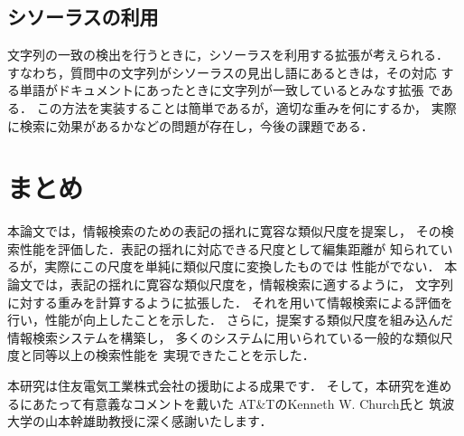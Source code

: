 \subsection{シソーラスの利用}

文字列の一致の検出を行うときに，シソーラスを利用する拡張が考えられる．
すなわち，質問中の文字列がシソーラスの見出し語にあるときは，その対応
する単語がドキュメントにあったときに文字列が一致しているとみなす拡張
である．
この方法を実装することは簡単であるが，適切な重みを何にするか，
実際に検索に効果があるかなどの問題が存在し，今後の課題である．

\section{まとめ}

本論文では，情報検索のための表記の揺れに寛容な類似尺度を提案し，
その検索性能を評価した．表記の揺れに対応できる尺度として編集距離が
知られているが，実際にこの尺度を単純に類似尺度に変換したものでは
性能がでない．
本論文では，表記の揺れに寛容な類似尺度を，情報検索に適するように，
文字列に対する重みを計算するように拡張した．
それを用いて情報検索による評価を行い，性能が向上したことを示した．
さらに，提案する類似尺度を組み込んだ情報検索システムを構築し，
多くのシステムに用いられている一般的な類似尺度と同等以上の検索性能を
実現できたことを示した．

\acknowledgment

本研究は住友電気工業株式会社の援助による成果です．
そして，本研究を進めるにあたって有意義なコメントを戴いた
AT\&TのKenneth W. Church氏と
筑波大学の山本幹雄助教授に深く感謝いたします．




